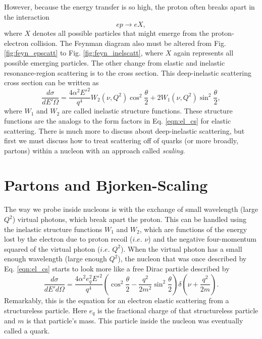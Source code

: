 However, because the energy transfer is so high, the proton often breaks apart in the interaction
\begin{equation}
ep \longrightarrow eX,
\end{equation}
where $X$ denotes all possible particles that might emerge from the proton-electron collision. The Feynman diagram also must be altered from Fig. \ref{fig:feyn_epscatt} to Fig. \ref{fig:feyn_inelscatt}, where $X$ again represents all possible emerging particles. The other change from elastic and inelastic resonance-region scattering is to the cross section. This deep-inelastic scattering cross section can be written as
\begin{equation}
\frac{d\sigma}{dE'\Omega} = \frac{4\alpha^2E'^2}{q^4} W_2(\nu,Q^2)\cos^2\frac{\theta}{2} +2W_1(\nu,Q^2) \sin^2 \frac{\theta}{2},
\end{equation}
where $W_1$ and $W_2$ are called inelastic structure functions. These structure functions are the analogs to the form factors in Eq. \ref{eqn:el_cs} for elastic scattering. There is much more to discuss about deep-inelastic scattering, but first we must discuss how to treat scattering off of quarks (or more broadly, partons) within a nucleon with an approach called \textit{scaling}.

\section{Partons and Bjorken-Scaling}
The way we probe inside nucleons is with the exchange of small wavelength (large $Q^2$) virtual photons, which break apart the proton. This can be handled using the inelastic structure functions $W_1$ and $W_2$, which are functions of the energy lost by the electron due to proton recoil ($i.e.$ $\nu$) and the negative four-momentum squared of the virtual photon ($i.e.$ $Q^2$). When the virtual photon has a small enough wavelength (large enough $Q^2$), the nucleon that was once described by Eq. \ref{eqn:el_cs} starts to look more like a free Dirac particle described by
\begin{equation}
\label{eqn:quark_scatt}
\frac{d\sigma}{dE'd\Omega} = \frac{4 \alpha^2 e_q^2 E'^2}{q^4} \left( \cos^2 \frac{\theta}{2} - \frac{q^2}{2m^2}\sin^2 \frac{\theta}{2} \right) \delta \left( \nu + \frac{q^2}{2m} \right).
\end{equation} 
Remarkably, this is the equation for an electron elastic scattering from a structureless particle. Here $e_q$ is the fractional charge of that structureless particle and $m$ is that particle's mass. This particle inside the nucleon was eventually called a quark.


